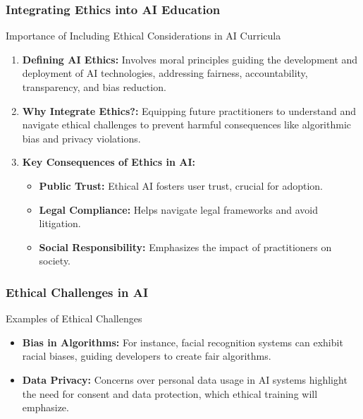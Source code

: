 \documentclass{beamer}
\begin{document}
\begin{frame}[fragile]
    \frametitle{Integrating Ethics into AI Education}
    \begin{block}{Importance of Including Ethical Considerations in AI Curricula}
        \begin{enumerate}
            \item \textbf{Defining AI Ethics:} Involves moral principles guiding the development and deployment of AI technologies, addressing fairness, accountability, transparency, and bias reduction.
            \item \textbf{Why Integrate Ethics?:} Equipping future practitioners to understand and navigate ethical challenges to prevent harmful consequences like algorithmic bias and privacy violations.
            \item \textbf{Key Consequences of Ethics in AI:}
            \begin{itemize}
                \item \textbf{Public Trust:} Ethical AI fosters user trust, crucial for adoption.
                \item \textbf{Legal Compliance:} Helps navigate legal frameworks and avoid litigation.
                \item \textbf{Social Responsibility:} Emphasizes the impact of practitioners on society.
            \end{itemize}
        \end{enumerate}
    \end{block}
\end{frame}

\begin{frame}[fragile]
    \frametitle{Ethical Challenges in AI}
    \begin{block}{Examples of Ethical Challenges}
        \begin{itemize}
            \item \textbf{Bias in Algorithms:} For instance, facial recognition systems can exhibit racial biases, guiding developers to create fair algorithms.
            \item \textbf{Data Privacy:} Concerns over personal data usage in AI systems highlight the need for consent and data protection, which ethical training will emphasize.
        \end{itemize}
    \end{block}
\end{frame}
\end{document}
